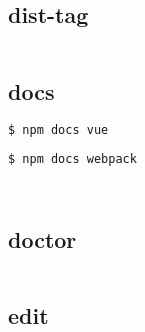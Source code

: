 \begin{lstlisting}[language=bash]

\end{lstlisting}

\subsection{dist-tag}


\begin{lstlisting}[language=bash]

\end{lstlisting}

\subsection{docs}



\begin{lstlisting}[language=bash]
$ npm docs vue
\end{lstlisting}



\begin{lstlisting}[language=bash]
$ npm docs webpack
\end{lstlisting}


\begin{lstlisting}[language=bash]

\end{lstlisting}



\begin{lstlisting}[language=bash]

\end{lstlisting}

\subsection{doctor}



\begin{lstlisting}[language=bash]

\end{lstlisting}

\subsection{edit}



\begin{lstlisting}[language=bash]

\end{lstlisting}


